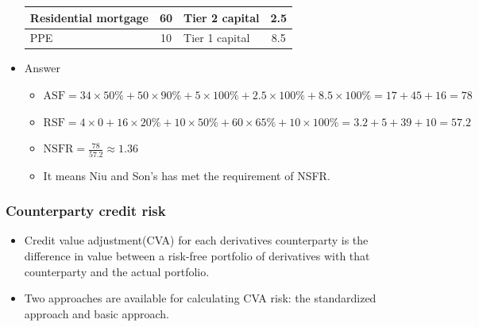 \begin{itemize}
\begin{table}[H]
\begin{tabular}{|l|c|l|c|}
            Residential mortgage & 60 & Tier 2 capital & 2.5 \\
            \hline
            PPE & 10 & Tier 1 capital & 8.5 \\
            \hline
        \end{tabular}
    \end{table}
\item Answer
    \begin{itemize}
        \item \(\text{ASF} = 34 \times 50\% + 50 \times 90\% + 5 \times 100\% + 2.5 \times 100\% + 8.5 \times 100\% = 17 + 45 + 16 = 78\)
        \item \(\text{RSF} = 4 \times 0 + 16 \times 20\% + 10 \times 50\% + 60 \times 65\% + 10 \times 100\% = 3.2 + 5 + 39 + 10 = 57.2\)
        \item \(\text{NSFR} = \frac{78}{57.2} \approx 1.36\)
        \item It means Niu and Son’s has met the requirement of NSFR.
    \end{itemize}

\end{itemize}



\subsubsection{Counterparty credit risk}
\begin{itemize}
\item Credit value adjustment(CVA) for each derivatives counterparty is the difference in value between a risk-free portfolio of derivatives with that counterparty and the actual portfolio.
\item Two approaches are available for calculating CVA risk: the standardized approach and basic approach.
\end{itemize}




